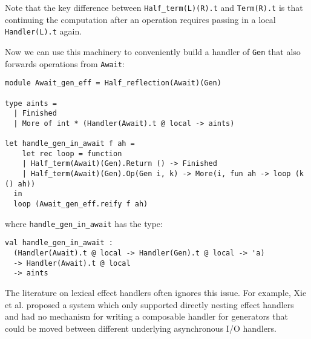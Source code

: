 \documentclass[acmsmall, screen, nonacm]{acmart}
\theoremstyle{definition}
\begin{document}
Note that the key difference between
\lstinline[style=oxcaml]{Half_term(L)(R).t} and
\lstinline[style=oxcaml]{Term(R).t} is that continuing the computation
after an operation requires passing in a local
\lstinline[style=oxcaml]{Handler(L).t} again.

%
%

Now we can use this machinery to conveniently build a handler of
\lstinline[style=oxcaml]{Gen} that also forwards operations from
\lstinline[style=oxcaml]{Await}:
\begin{lstlisting}[style=oxcaml]
module Await_gen_eff = Half_reflection(Await)(Gen)

type aints =
  | Finished
  | More of int * (Handler(Await).t @ local -> aints)

let handle_gen_in_await f ah =
    let rec loop = function
    | Half_term(Await)(Gen).Return () -> Finished
    | Half_term(Await)(Gen).Op(Gen i, k) -> More(i, fun ah -> loop (k () ah))
  in
  loop (Await_gen_eff.reify f ah)
\end{lstlisting}
where \lstinline[style=oxcaml]{handle_gen_in_await} has the type:
\begin{lstlisting}[style=oxcaml]
val handle_gen_in_await :
  (Handler(Await).t @ local -> Handler(Gen).t @ local -> 'a)
  -> Handler(Await).t @ local
  -> aints
\end{lstlisting}

The literature on lexical effect handlers often ignores this issue. For
example, Xie et al. \cite{xie2020effect} proposed a system which only
supported directly nesting effect handlers and had no mechanism for
writing a composable handler for generators that could be moved between
different underlying asynchronous I/O handlers.
\end{document}

